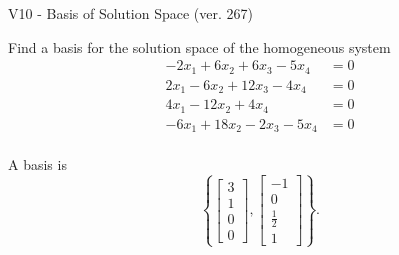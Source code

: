 \begin{exercise}
  \begin{exerciseTitle}V10 - Basis of Solution Space (ver. 267)\end{exerciseTitle}
  \begin{exerciseStatement}
    Find a basis for the solution space of the homogeneous system 
\begin{align*}
 -2 x_ 1 + 6 x_ 2 + 6 x_ 3 -5 x_ 4 &= 0  \\ 
  2 x_ 1 -6 x_ 2 + 12 x_ 3 -4 x_ 4 &= 0  \\ 
  4 x_ 1 -12 x_ 2 + 4 x_ 4 &= 0  \\ 
  -6 x_ 1 + 18 x_ 2 -2 x_ 3 -5 x_ 4 &= 0  \\ 
 \end{align*}


 
  \end{exerciseStatement}

  \begin{exerciseAnswer}
   A basis is   
\[\left\{\left[\begin{array}{c}
3 \\
1 \\
0 \\
0
\end{array}\right] , \left[\begin{array}{c}
-1 \\
0 \\
\frac{1}{2} \\
1
\end{array}\right]\right\}.\]

  


  \end{exerciseAnswer}
\end{exercise}